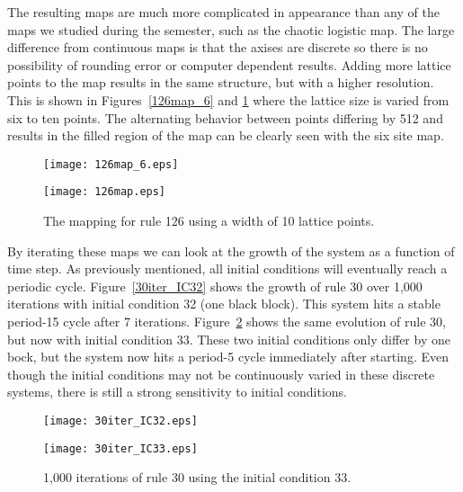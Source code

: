 The resulting maps are much more complicated in appearance than any of the maps we studied during the semester, such as the chaotic logistic map.  The large difference from continuous maps is that the axises are discrete so there is no possibility of rounding error or computer dependent results.  Adding more lattice points to the map results in the same structure, but with a higher resolution.  This is shown in Figures~\ref{126map_6} and \ref{126map} where the lattice size is varied from six to ten points.  The alternating behavior between points differing by 512 and results in the filled region of the map can be clearly seen with the six site map.  

\begin{figure}
    \begin{minipage}[b]{0.49\textwidth}
        \centering
        \texttt{[image: 126map\_6.eps]}
        \caption{\label{126map_6} The mapping for rule 126 using a width of 6 lattice points.  }
    \end{minipage}
    \hspace{0.5cm}
    \begin{minipage}[b]{0.49\textwidth}
        \centering
        \texttt{[image: 126map.eps]}
        \caption{\label{126map} The mapping for rule 126 using a width of 10 lattice points.}
    \end{minipage}
\end{figure}

By iterating these maps we can look at the growth of the system as a function of time step.  As previously mentioned, all initial conditions will eventually reach a periodic cycle.  Figure~\ref{30iter_IC32} shows the growth of rule 30 over 1,000 iterations with initial condition 32 (one black block).  This system hits a stable period-15 cycle after 7 iterations.  Figure~\ref{30iter_IC33} shows the same evolution of rule 30, but now with initial condition 33.  These two initial conditions only differ by one bock, but the system now hits a period-5 cycle immediately after starting.  Even though the initial conditions may not be continuously varied in these discrete systems, there is still a strong sensitivity to initial conditions.  

\begin{figure}
    \begin{minipage}[b]{0.49\textwidth}
        \centering
        \texttt{[image: 30iter\_IC32.eps]}
        \caption{\label{30iter_IC32} 1,000 iterations of rule 30 with an initial condition of 32.   }
    \end{minipage}
    \hspace{0.5cm}
    \begin{minipage}[b]{0.49\textwidth}
        \centering
        \texttt{[image: 30iter\_IC33.eps]}
        \caption{\label{30iter_IC33} 1,000 iterations of rule 30 using the initial condition 33. }
    \end{minipage}
\end{figure}



